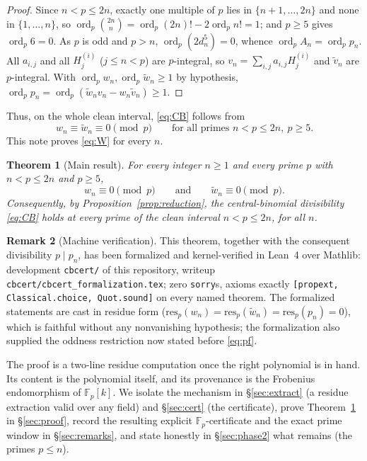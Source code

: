 \documentclass[11pt]{article}
\newtheorem{theorem}{Theorem}
\theoremstyle{definition}
\newtheorem{remark}[theorem]{Remark}
\DeclareMathOperator{\ord}{ord}
\newcommand{\Fp}{\mathbb{F}_p}
\newcommand{\bin}[2]{\binom{#1}{#2}}
\newcommand{\wt}{\widetilde}
\begin{document}
\begin{proof}
Since $n<p\le2n$, exactly one multiple of $p$ lies in $\{n+1,\dots,2n\}$ and none
in $\{1,\dots,n\}$, so $\ord_p\bin{2n}{n}=\ord_p(2n)!-2\ord_p n!=1$; and $p\ge5$
gives $\ord_p6=0$. As $p$ is odd and $p>n$, $\ord_p(2d_n^5)=0$, whence
$\ord_p A_n=\ord_p p_n$. All $a_{i,j}$ and all $H_j^{(i)}$ ($j\le n<p$) are
$p$-integral, so $v_n=\sum_{i,j}a_{i,j}H_j^{(i)}$ and $\widetilde v_n$ are
$p$-integral. With $\ord_p w_n,\ord_p\wt w_n\ge1$ by hypothesis,
$\ord_p p_n=\ord_p(\widetilde w_nv_n-w_n\widetilde v_n)\ge1$.
\end{proof}

Thus, on the whole clean interval, \eqref{eq:CB} follows from
\begin{equation}\label{eq:W}
w_n\equiv \wt w_n\equiv 0\pmod p\qquad\text{for all primes }n<p\le 2n,\ p\ge5.
\tag{W}
\end{equation}
This note proves \eqref{eq:W} for every $n$.

\begin{theorem}[Main result]\label{thm:main}
For every integer $n\ge1$ and every prime $p$ with $n<p\le 2n$ and $p\ge5$,
\[
w_n\equiv 0\pmod p\qquad\text{and}\qquad \wt w_n\equiv 0\pmod p .
\]
Consequently, by Proposition~\textup{\ref{prop:reduction}}, the central-binomial
divisibility \eqref{eq:CB} holds at every prime of the clean interval
$n<p\le 2n$, for all $n$.
\end{theorem}

\begin{remark}[Machine verification]\label{rem:lean}
This theorem, together with the consequent divisibility $p\mid p_n$, has been
formalized and kernel-verified in Lean~4 over Mathlib: development
\texttt{cbcert/} of this repository, writeup
\texttt{cbcert/cbcert\_formalization.tex}; zero \texttt{sorry}s, axioms
exactly \texttt{[propext, Classical.choice, Quot.sound]} on every named
theorem. The formalized statements are cast in residue form
($\mathrm{res}_p(w_n)=\mathrm{res}_p(\wt w_n)=\mathrm{res}_p(p_n)=0$), which
is faithful without any nonvanishing hypothesis; the formalization also
supplied the oddness restriction now stated before \eqref{eq:pf}.
\end{remark}

The proof is a two-line residue computation once the right polynomial is in hand.
Its content is the polynomial itself, and its provenance is the Frobenius
endomorphism of $\Fp[k]$. We isolate the mechanism in \S\ref{sec:extract}
(a residue extraction valid over any field) and \S\ref{sec:cert} (the certificate),
prove Theorem~\ref{thm:main} in \S\ref{sec:proof}, record the resulting explicit
$\Fp$-certificate and the exact prime window in \S\ref{sec:remarks}, and state
honestly in \S\ref{sec:phase2} what remains (the primes $p\le n$).
\end{document}
